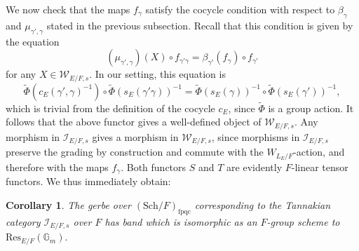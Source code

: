 \documentclass[11pt]{amsart}
\newtheorem{cor}[thm]{Corollary}
\theoremstyle{definition}
\newcommand{\mc}{\mathcal}
\begin{document}
We now check that the maps $f_{\gamma}$ satisfy the cocycle condition with respect to $\beta_{\gamma}$ and $\mu_{\gamma',\gamma}$ stated in the previous subsection. Recall that this condition is given by the equation
\begin{equation*}
    (\mu_{\gamma',\gamma})(X) \circ f_{\gamma'\gamma} = \beta_{\gamma'}(f_{\gamma}) \circ f_{\gamma'}
\end{equation*}
for any $X \in \mc{W}_{E/F,s}$. In our setting, this equation is 
$$\tilde{\Phi}(c_{E}(\gamma',\gamma)^{-1}) \circ \tilde{\Phi}(s_{E}(\gamma'\gamma))^{-1} = \tilde{\Phi}(s_{E}(\gamma))^{-1} \circ \tilde{\Phi}(s_{E}(\gamma'))^{-1},$$ which is trivial from the definition of the cocycle $c_{E}$, since $\tilde{\Phi}$ is a group action. It follows that the above functor gives a well-defined object of $\mc{W}_{E/F,s}$. Any morphism in $\mc{I}_{E/F,s}$ gives a morphism in $\mc{W}_{E/F,s}$, since morphisms in $\mc{I}_{E/F,s}$ preserve the grading by construction and commute with the $W_{L_{E}/F}$-action, and therefore with the maps $f_{\gamma}$. Both functors $S$ and $T$ are evidently $F$-linear tensor functors. We thus immediately obtain:

\begin{cor} The gerbe over $(\text{Sch}/F)_{\text{fpqc}}$ corresponding to the Tannakian category $\mc{I}_{E/F,s}$ over $F$ has band which is isomorphic as an $F$-group scheme to $\text{Res}_{E/F}(\mathbb{G}_{m}).$
\end{cor}
\end{document}
